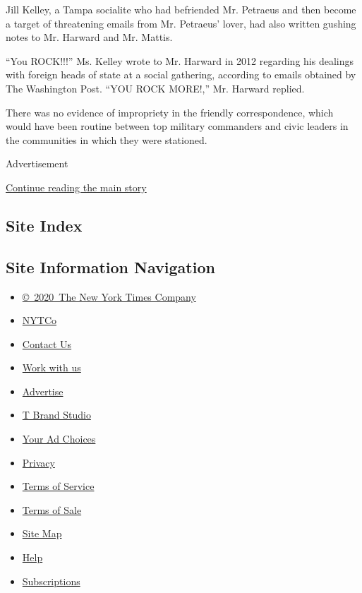 Jill Kelley, a Tampa socialite who had befriended Mr. Petraeus and then
become a target of threatening emails from Mr. Petraeus' lover, had also
written gushing notes to Mr. Harward and Mr. Mattis.

``You ROCK!!!'' Ms. Kelley wrote to Mr. Harward in 2012 regarding his
dealings with foreign heads of state at a social gathering, according to
emails obtained by The Washington Post. ``YOU ROCK MORE!,'' Mr. Harward
replied.

There was no evidence of impropriety in the friendly correspondence,
which would have been routine between top military commanders and civic
leaders in the communities in which they were stationed.

Advertisement

\protect\hyperlink{after-bottom}{Continue reading the main story}

\hypertarget{site-index}{%
\subsection{Site Index}\label{site-index}}

\hypertarget{site-information-navigation}{%
\subsection{Site Information
Navigation}\label{site-information-navigation}}

\begin{itemize}
\tightlist
\item
  \href{https://help.nytimes.com/hc/en-us/articles/115014792127-Copyright-notice}{©~2020~The
  New York Times Company}
\end{itemize}

\begin{itemize}
\tightlist
\item
  \href{https://www.nytco.com/}{NYTCo}
\item
  \href{https://help.nytimes.com/hc/en-us/articles/115015385887-Contact-Us}{Contact
  Us}
\item
  \href{https://www.nytco.com/careers/}{Work with us}
\item
  \href{https://nytmediakit.com/}{Advertise}
\item
  \href{http://www.tbrandstudio.com/}{T Brand Studio}
\item
  \href{https://www.nytimes.com/privacy/cookie-policy\#how-do-i-manage-trackers}{Your
  Ad Choices}
\item
  \href{https://www.nytimes.com/privacy}{Privacy}
\item
  \href{https://help.nytimes.com/hc/en-us/articles/115014893428-Terms-of-service}{Terms
  of Service}
\item
  \href{https://help.nytimes.com/hc/en-us/articles/115014893968-Terms-of-sale}{Terms
  of Sale}
\item
  \href{https://spiderbites.nytimes.com}{Site Map}
\item
  \href{https://help.nytimes.com/hc/en-us}{Help}
\item
  \href{https://www.nytimes.com/subscription?campaignId=37WXW}{Subscriptions}
\end{itemize}
